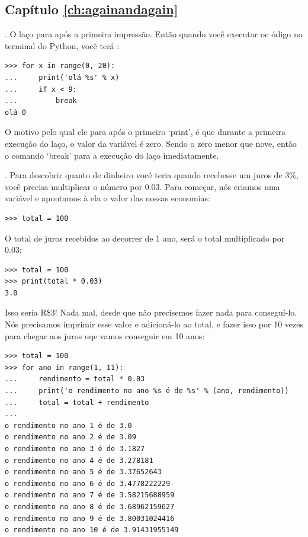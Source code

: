 \subsection*{Capítulo \ref{ch:againandagain}}

. O laço para após a primeira impressão. Então quando você executar oc ódigo no terminal do Python, você terá :

\begin{listing}
\begin{verbatim}
>>> for x in range(0, 20):
...     print('olá %s' % x)
...     if x < 9:
...         break
olá 0
\end{verbatim}
\end{listing}

\noindent
O motivo pelo qual ele para após o primeiro `print', é que durante a primeira execução do laço, o valor da variável  é zero. Sendo o zero menor que nove, então o comando `break' para a execução do laço imediatamente.

. Para descobrir quanto de dinheiro você teria quando recebesse um juros de 3\%, você precisa multiplicar o número por 0.03. Para começar, nós criamos uma variável e apontamos à ela o valor das nossas economias:

\begin{listing}
\begin{verbatim}
>>> total = 100
\end{verbatim}
\end{listing}

O total de juros recebidos ao decorrer de 1 ano, será o total multiplicado por 0.03:

\begin{listing}
\begin{verbatim}
>>> total = 100
>>> print(total * 0.03)
3.0
\end{verbatim}
\end{listing}

Isso seria R\$3! Nada mal, desde que não precisemos fazer nada para conseguí-lo. Nós precisamos imprimir esse valor e adicioná-lo ao total, e fazer isso por 10 vezes para chegar aos juros uqe vamos conseguir em 10 anos:

\begin{listing}
\begin{verbatim}
>>> total = 100
>>> for ano in range(1, 11):
...     rendimento = total * 0.03
...     print('o rendimento no ano %s é de %s' % (ano, rendimento))
...     total = total + rendimento
... 
o rendimento no ano 1 é de 3.0
o rendimento no ano 2 é de 3.09
o rendimento no ano 3 é de 3.1827
o rendimento no ano 4 é de 3.278181
o rendimento no ano 5 é de 3.37652643
o rendimento no ano 6 é de 3.4778222229
o rendimento no ano 7 é de 3.58215688959
o rendimento no ano 8 é de 3.68962159627
o rendimento no ano 9 é de 3.80031024416
o rendimento no ano 10 é de 3.91431955149
\end{verbatim}
\end{listing}

